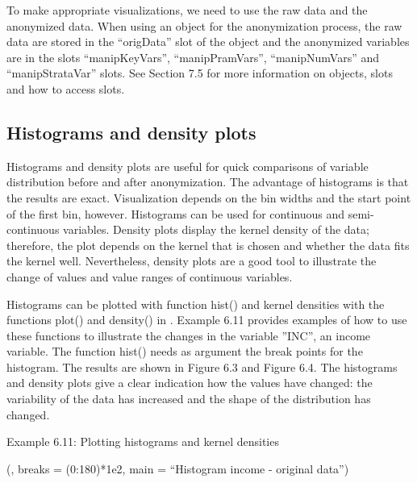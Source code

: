 \documentclass[letterpaper,10pt,english]{sphinxmanual}
\begin{document}
To make appropriate visualizations, we need to use the raw data and the
anonymized data. When using an  object for the anonymization
process, the raw data are stored in the “origData” slot of the object
and the anonymized variables are in the slots “manipKeyVars”,
“manipPramVars”, “manipNumVars” and “manipStrataVar” slots. See Section
7.5 for more information on  objects, slots and how to access
slots.


\subsection{Histograms and density plots}
\label{\detokenize{utility:histograms-and-density-plots}}
Histograms and density plots are useful for quick comparisons of
variable distribution before and after anonymization. The advantage of
histograms is that the results are exact. Visualization depends on the
bin widths and the start point of the first bin, however. Histograms can
be used for continuous and semi-continuous variables. Density plots
display the kernel density of the data; therefore, the plot depends on
the kernel that is chosen and whether the data fits the kernel well.
Nevertheless, density plots are a good tool to illustrate the change of
values and value ranges of continuous variables.

Histograms can be plotted with function hist() and kernel densities with
the functions plot() and density() in . Example 6.11 provides
examples of how to use these functions to illustrate the changes in the
variable ”INC”, an income variable. The function hist() needs as
argument the break points for the histogram. The results are shown in
Figure 6.3 and Figure 6.4. The histograms and density plots give a clear
indication how the values have changed: the variability of the data has
increased and the shape of the distribution has changed. 

Example 6.11: Plotting histograms and kernel densities

\begin{DUlineblock}{0em}
\item[] 
\item[] 
\item[] (, breaks = (0:180)*1e2, main =
“Histogram income - original data”)
\end{DUlineblock}
\end{document}
